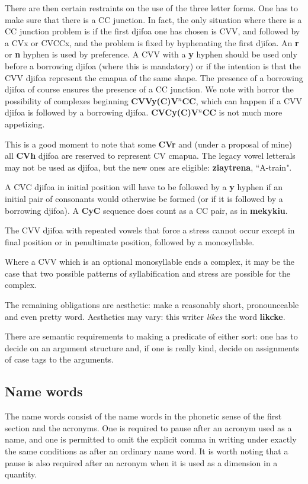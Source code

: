 \documentclass[12pt]{book}
\begin{document}
{There are then certain restraints on the use of the three letter forms.  One has to make sure that there is a CC junction.  In fact, the only situation where there is a CC
junction problem  is if the first djifoa one has chosen is CVV, and followed by a CVx or CVCCx, and the problem is fixed by hyphenating the first djifoa.  An {\bf r} or {\bf n} hyphen is used by preference.  A CVV with a {\bf y} hyphen should be used only before a borrowing djifoa (where this is mandatory) or if the intention is that the CVV djifoa represent the cmapua of the same shape.  The presence of a borrowing djifoa of course ensures the presence of a CC junction.  We note with horror the possibility of complexes beginning  {\bf CVVy(C)V$^n$CC}, which can happen if a CVV djifoa is followed by a borrowing djifoa.  {\bf CVCy(C)V$^n$CC} is not much more appetizing.

This is a good moment to note that some {\bf CVr} and (under a proposal of mine) all {\bf CVh} djifoa are reserved to represent CV cmapua.  The legacy vowel letterals may not be used as djifoa, but the new ones are eligible:  {\bf ziaytrena}, ``A-train".

A CVC djifoa in initial position will have to be followed by a {\bf y} hyphen if an initial pair of consonants would otherwise be formed (or if it is followed by a borrowing djifoa).
A {\bf CyC} sequence does count as a CC pair, as in {\bf mekykiu}.

The CVV djifoa with repeated vowels that force a stress cannot occur except in final position or in penultimate position, followed by a monosyllable.

Where a CVV which is an optional monosyllable ends a complex, it may be the case that two possible patterns of syllabification and stress are possible for the complex.

The remaining obligations are aesthetic:  make a reasonably short, pronounceable and even pretty word.  Aesthetics may vary:  this writer {\em likes} the word {\bf likcke}.

There are semantic requirements to making a predicate of either sort:  one has to decide on an argument structure and, if one is really kind, decide on assignments of case tags to the arguments.

\subsection{Name words}

The name words consist of the name words in the phonetic sense of the first section and the acronyms.   One is required to pause after an acronym used as a name, and one is permitted
to omit the explicit comma in writing under exactly the same conditions as after an ordinary name word.  It is worth noting that a pause is also required after an acronym when it is used as a dimension in a quantity.

}
\end{document}
